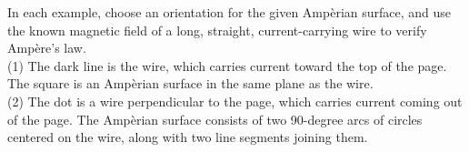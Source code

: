 In each example, choose an orientation for the given Amp\`erian surface, and
use the known magnetic field of a long, straight, current-carrying wire to verify Amp\`ere's law.\\
(1) The dark line is the wire, which carries current toward the top of the page. The square is an Amp\`erian surface
in the same plane as the wire. \\
(2) The dot is a wire perpendicular to the page, which carries current coming out of the page.
The Amp\`erian surface consists of two 90-degree arcs of circles centered on the wire, along with two
line segments joining them.
